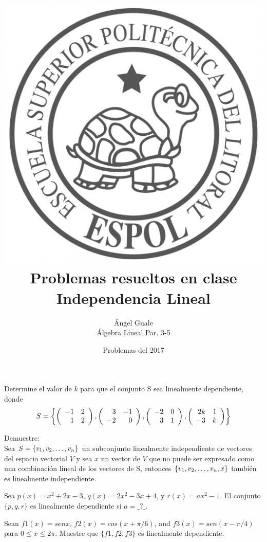 \documentclass[10pt]{article}
\begin{document}
\title{\includegraphics[scale=0.07]{logo_espol_3}\\Problemas resueltos en clase \\Independencia Lineal}
\author{Ángel Guale\\
Álgebra Lineal Par. 3-5\\
}
\date{Problemas del 2017}
\maketitle

\problem{}
Determine el valor de $k$ para que el conjunto S sea linealmente dependiente, donde $$S=\left\{ \left( \begin{array}{rr} -1&2\\ 1&2 \end{array} \right) ,  \left( \begin{array}{rr} 3&-1\\ -2&0 \end{array} \right) ,  \left( \begin{array}{rr} -2&0\\ 3&1 \end{array} \right) , \left( \begin{array}{rr} 2k&1\\ -3&k \end{array} \right) \right\}$$

\problem{}
Demuestre:
\\Sea $S= \lbrace v_1, v_2, \ldots, v_n \rbrace$ un subconjunto linealmente independiente de vectores del espacio vectorial $V$ y sea $x$ un vector de $V$ que no puede ser expresado como una combinaci\'on lineal de los vectores de S, entonces $ \left\{ v_1, v_2, \ldots, v_n, x \right\} $
tambi\'en es linealmente independiente.

\problem{}
Sea $p(x)= x^2+2x-3$, $q(x)=2x^2-3x+4$, y $r(x)=ax^2-1$. El conjunto $\{p, q, r\}$ es
linealmente dependiente si $a=\_?\_$.

\problem{}
Sean $f1(x) = sen x$, $f2(x) = cos(x+\pi/6)$, and $f3(x) = sen(x-\pi/4)$ para $0 \leq x \leq 2\pi$. Muestre que 
$\{f1, f2, f3\}$ es linealmente dependiente.
\end{document}
